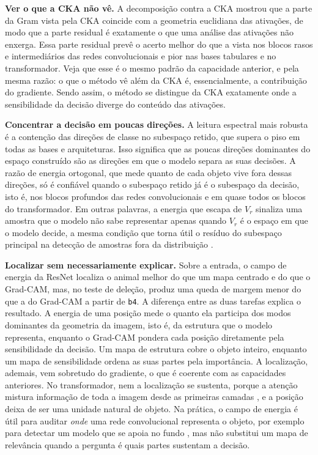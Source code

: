 \textbf{Ver o que a CKA não vê.} A decomposição contra a CKA mostrou que a parte da Gram vista pela CKA coincide com a geometria euclidiana das ativações, de modo que a parte residual é exatamente o que uma análise das ativações não enxerga. Essa parte residual prevê o acerto melhor do que a vista nos blocos rasos e intermediários das redes convolucionais e pior nas bases tabulares e no transformador. Veja que esse é o mesmo padrão da capacidade anterior, e pela mesma razão: o que o método vê além da CKA é, essencialmente, a contribuição do gradiente. Sendo assim, o método se distingue da CKA exatamente onde a sensibilidade da decisão diverge do conteúdo das ativações.

\textbf{Concentrar a decisão em poucas direções.} A leitura espectral mais robusta é a contenção das direções de classe no subespaço retido, que supera o piso em todas as bases e arquiteturas. Isso significa que as poucas direções dominantes do espaço construído são as direções em que o modelo separa as suas decisões. A razão de energia ortogonal, que mede quanto de cada objeto vive fora dessas direções, só é confiável quando o subespaço retido já é o subespaço da decisão, isto é, nos blocos profundos das redes convolucionais e em quase todos os blocos do transformador. Em outras palavras, a energia que escapa de $V_r$ sinaliza uma amostra que o modelo não sabe representar apenas quando $V_r$ é o espaço em que o modelo decide, a mesma condição que torna útil o resíduo do subespaço principal na detecção de amostras fora da distribuição \citep{Wang2022ViM}.

\textbf{Localizar sem necessariamente explicar.} Sobre a entrada, o campo de energia da ResNet localiza o animal melhor do que um mapa centrado e do que o Grad-CAM, mas, no teste de deleção, produz uma queda de margem menor do que a do Grad-CAM a partir de \texttt{b4}. A diferença entre as duas tarefas explica o resultado. A energia de uma posição mede o quanto ela participa dos modos dominantes da geometria da imagem, isto é, da estrutura que o modelo representa, enquanto o Grad-CAM pondera cada posição diretamente pela sensibilidade da decisão. Um mapa de estrutura cobre o objeto inteiro, enquanto um mapa de sensibilidade ordena as suas partes pela importância. A localização, ademais, vem sobretudo do gradiente, o que é coerente com as capacidades anteriores. No transformador, nem a localização se sustenta, porque a atenção mistura informação de toda a imagem desde as primeiras camadas \citep{Raghu2021}, e a posição deixa de ser uma unidade natural de objeto. Na prática, o campo de energia é útil para auditar \textit{onde} uma rede convolucional representa o objeto, por exemplo para detectar um modelo que se apoia no fundo \citep{Geirhos2020}, mas não substitui um mapa de relevância quando a pergunta é quais partes sustentam a decisão.


